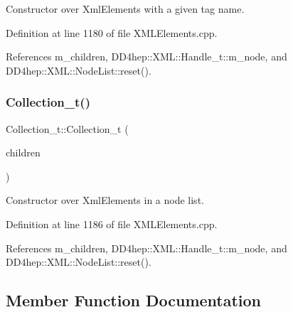Constructor over Xml\+Elements with a given tag name. 



Definition at line 1180 of file X\+M\+L\+Elements.\+cpp.



References m\+\_\+children, D\+D4hep\+::\+X\+M\+L\+::\+Handle\+\_\+t\+::m\+\_\+node, and D\+D4hep\+::\+X\+M\+L\+::\+Node\+List\+::reset().

\hypertarget{class_d_d4hep_1_1_x_m_l_1_1_collection__t_a0db8adadf0bba07706766dbc027f5151}{}\label{class_d_d4hep_1_1_x_m_l_1_1_collection__t_a0db8adadf0bba07706766dbc027f5151} 
\subsubsection{\texorpdfstring{Collection\+\_\+t()}{Collection\_t()}\hspace{0.1cm}{\footnotesize\ttfamily [3/3]}}
{\footnotesize\ttfamily Collection\+\_\+t\+::\+Collection\+\_\+t (\begin{DoxyParamCaption}\item[{\hyperlink{class_d_d4hep_1_1_x_m_l_1_1_node_list}{Node\+List}}]{children }\end{DoxyParamCaption})}



Constructor over Xml\+Elements in a node list. 



Definition at line 1186 of file X\+M\+L\+Elements.\+cpp.



References m\+\_\+children, D\+D4hep\+::\+X\+M\+L\+::\+Handle\+\_\+t\+::m\+\_\+node, and D\+D4hep\+::\+X\+M\+L\+::\+Node\+List\+::reset().



\subsection{Member Function Documentation}
\hypertarget{class_d_d4hep_1_1_x_m_l_1_1_collection__t_a17ee76aff895acb4928cf3a157da4fc5}{}\label{class_d_d4hep_1_1_x_m_l_1_1_collection__t_a17ee76aff895acb4928cf3a157da4fc5} 
